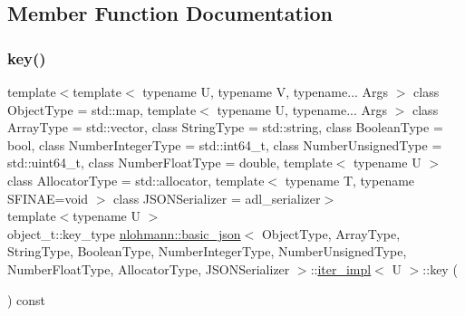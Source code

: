\subsection{Member Function Documentation}
\mbox{\label{classnlohmann_1_1basic__json_1_1iter__impl_a030a45b63b70e12b18ad4f6c1c4f1239}} 
\subsubsection{\texorpdfstring{key()}{key()}}
{\footnotesize\ttfamily template$<$template$<$ typename U, typename V, typename... Args $>$ class Object\+Type = std\+::map, template$<$ typename U, typename... Args $>$ class Array\+Type = std\+::vector, class String\+Type  = std\+::string, class Boolean\+Type  = bool, class Number\+Integer\+Type  = std\+::int64\+\_\+t, class Number\+Unsigned\+Type  = std\+::uint64\+\_\+t, class Number\+Float\+Type  = double, template$<$ typename U $>$ class Allocator\+Type = std\+::allocator, template$<$ typename T, typename S\+F\+I\+N\+A\+E=void $>$ class J\+S\+O\+N\+Serializer = adl\+\_\+serializer$>$ \\
template$<$typename U $>$ \\
object\+\_\+t\+::key\+\_\+type \mbox{\hyperlink{classnlohmann_1_1basic__json}{nlohmann\+::basic\+\_\+json}}$<$ Object\+Type, Array\+Type, String\+Type, Boolean\+Type, Number\+Integer\+Type, Number\+Unsigned\+Type, Number\+Float\+Type, Allocator\+Type, J\+S\+O\+N\+Serializer $>$\+::\mbox{\hyperlink{classnlohmann_1_1basic__json_1_1iter__impl}{iter\+\_\+impl}}$<$ U $>$\+::key (\begin{DoxyParamCaption}{ }\end{DoxyParamCaption}) const\hspace{0.3cm}{\ttfamily [inline]}}



